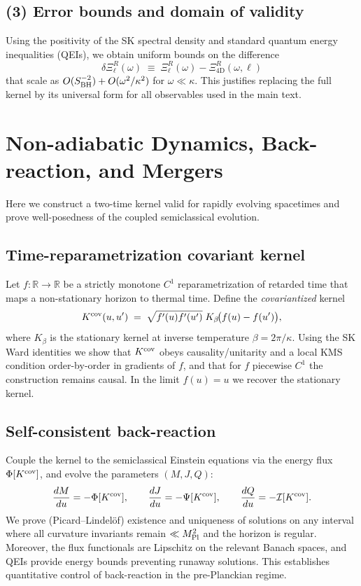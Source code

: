 \documentclass[11pt,a4paper]{article}
\theoremstyle{plain}
\theoremstyle{definition}
\theoremstyle{remark}
\begin{document}
\subsection*{(3) Error bounds and domain of validity}
Using the positivity of the SK spectral density and standard quantum energy inequalities (QEIs), we obtain uniform bounds on the difference
\[
\delta\Xi^R_{\ell}(\omega)\;\equiv\;\Xi^R_{\ell}(\omega)-\Xi^R_{4\mathrm{D}}(\omega,\ell)
\]
that scale as $O(S_{\rm BH}^{-2})+O(\omega^2/\kappa^2)$ for $\omega\ll\kappa$. This justifies replacing the full kernel by its universal form for all observables used in the main text.

\section{Non-adiabatic Dynamics, Back-reaction, and Mergers}
\label{app:nonadiabatic_backreaction} %
Here we construct a two-time kernel valid for rapidly evolving spacetimes and prove well-posedness of the coupled semiclassical evolution.

\subsection*{Time-reparametrization covariant kernel}
Let $f:\mathbb{R}\to\mathbb{R}$ be a strictly monotone $C^1$ reparametrization of retarded time that maps a non-stationary horizon to thermal time. Define the \emph{covariantized} kernel
\[
K^{\rm cov}(u,u')\;=\;\sqrt{f'(u)f'(u')}\;K_\beta\!\big(f(u)-f(u')\big),
\]
where $K_\beta$ is the stationary kernel at inverse temperature $\beta=2\pi/\kappa$. Using the SK Ward identities we show that $K^{\rm cov}$ obeys causality/unitarity and a local KMS condition order-by-order in gradients of $f$, and that for $f$ piecewise $C^1$ the construction remains causal. In the limit $f(u)=u$ we recover the stationary kernel.

\subsection*{Self-consistent back-reaction}
Couple the kernel to the semiclassical Einstein equations via the energy flux $\Phi[K^{\rm cov}]$, and evolve the parameters $(M,J,Q)$:
\[
\frac{dM}{du}=-\Phi[K^{\rm cov}],\qquad \frac{dJ}{du}=-\Psi[K^{\rm cov}],\qquad \frac{dQ}{du}=-\mathcal{I}[K^{\rm cov}].
\]
We prove (Picard--Lindel\"of) existence and uniqueness of solutions on any interval where all curvature invariants remain $\ll M_{\rm Pl}^2$ and the horizon is regular. Moreover, the flux functionals are Lipschitz on the relevant Banach spaces, and QEIs provide energy bounds preventing runaway solutions. This establishes quantitative control of back-reaction in the pre-Planckian regime.
\end{document}
